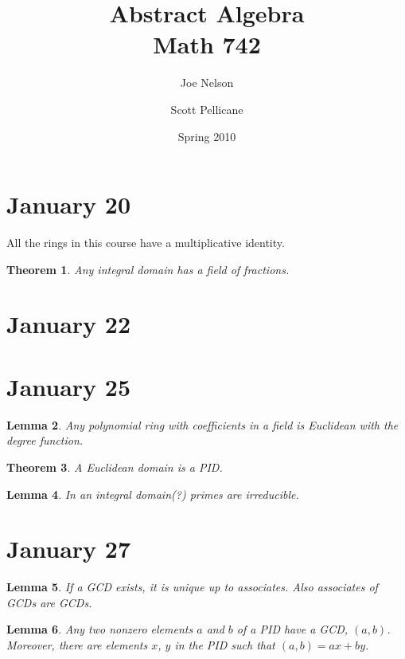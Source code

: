 \documentclass[letterpaper]{article}
\newtheorem{theorem}{Theorem}[section]
\newtheorem{lemma}[theorem]{Lemma}
\begin{document}
\title{Abstract Algebra\\
Math 742}
\author{Joe Nelson \and Scott Pellicane}
\date{Spring 2010}
\maketitle

\section{January 20}

All the rings in this course have a multiplicative identity.

\begin{theorem}
Any integral domain has a field of fractions.
\end{theorem}

\section{January 22}

\section{January 25}

\begin{lemma}
Any polynomial ring with coefficients in a field is Euclidean with the degree function.
\end{lemma}

\begin{theorem}
A Euclidean domain is a PID.
\end{theorem}

\begin{lemma}
In an integral domain(?) primes are irreducible.
\end{lemma}

\section{January 27}

\begin{lemma}
If a GCD exists, it is unique up to associates. Also associates of GCDs are GCDs.
\end{lemma}

\begin{lemma}
Any two nonzero elements $a$ and $b$ of a PID have a GCD, $(a, b)$. Moreover, there are elements $x$, $y$ in the PID such that $(a, b) = ax + by$. 
\end{lemma}
\end{document}
